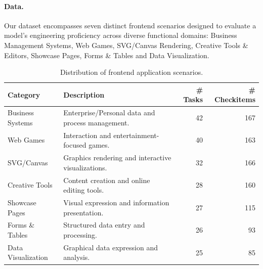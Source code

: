 \paragraph{Data.}
Our dataset encompasses seven distinct frontend scenarios designed to evaluate a model's engineering proficiency across diverse functional domains: Business Management Systems, Web Games, SVG/Canvas Rendering,  Creative Tools \& Editors, Showcase Pages, Forms \& Tables and Data Visualization.


\begin{table}[h]
\centering
\small
\caption{Distribution of frontend application scenarios.}
\begin{tabular}{lp{7cm}rr}
\toprule
\textbf{Category} & \textbf{Description} & \textbf{\# Tasks} & \textbf{\# Checkitems} \\
\midrule
Business Systems & Enterprise/Personal data and process management. & 42 & 167 \\
Web Games & Interaction and entertainment-focused games. & 40 & 163\\
SVG/Canvas & Graphics rendering and interactive visualizations. & 32 & 166\\
Creative Tools & Content creation and online editing tools. & 28 & 160\\
Showcase Pages & Visual expression and information presentation. & 27 & 115\\
Forms \& Tables & Structured data entry and processing. & 26 & 93\\
Data Visualization & Graphical data expression and analysis. & 25 & 85\\
\bottomrule
\end{tabular}

\end{table}

